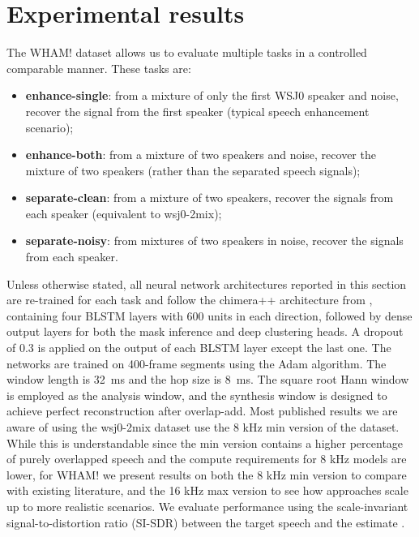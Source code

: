 \documentclass[a4paper]{article}
\begin{document}
\section{Experimental results}
The WHAM! dataset allows us to evaluate multiple tasks in a controlled comparable manner.  These tasks are:
\begin{itemize}[leftmargin=6mm, topsep=0pt]
    \setlength{\itemsep}{0pt}
    \setlength{\parsep}{3pt}
    \setlength{\parskip}{3pt}
        \item \textbf{enhance-single}: from a mixture of only the first WSJ0 speaker and noise, recover the signal from the first speaker (typical speech enhancement scenario);
        \item \textbf{enhance-both}: from a mixture of two speakers and noise, recover the mixture of two speakers (rather than the separated speech signals);
        \item \textbf{separate-clean}: from a mixture of two speakers, recover the signals from each speaker (equivalent to wsj0-2mix);
        \item \textbf{separate-noisy}: from mixtures of two speakers in noise, recover the signals from each speaker.
    \vspace{3pt}
\end{itemize}

Unless otherwise stated, all neural network architectures reported in this section are re-trained for each task and follow the chimera++ architecture from \cite{Wang2018Interspeech09}, containing four BLSTM layers with 600 units in each direction, followed by dense output layers for both the mask inference and deep clustering heads. A dropout of $0.3$ is applied on the output of each BLSTM layer except the last one. The networks are trained on 400-frame segments using the Adam algorithm. The window length is 32~ms and the hop size is 8~ms. The square root Hann window is employed as the analysis window, and the synthesis window is designed to achieve perfect reconstruction after overlap-add.  Most published results we are aware of using the wsj0-2mix dataset use the 8 kHz min version of the dataset.  While this is understandable since the min version contains a higher percentage of purely overlapped speech and the compute requirements for 8 kHz models are lower, for WHAM! we present results on both the 8 kHz min version to compare with existing literature, and the 16 kHz max version to see how approaches scale up to more realistic scenarios.  We evaluate performance using the scale-invariant signal-to-distortion ratio (SI-SDR) between the target speech and the estimate \cite{LeRoux2018SISDR}.
\end{document}
